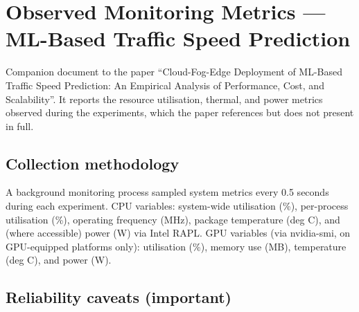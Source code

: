 \documentclass[
  9pt, a4paper, landscape]{article}
\author{}
\date{}
\begin{document}
\hypertarget{observed-monitoring-metrics-ml-based-traffic-speed-prediction}{%
\section{Observed Monitoring Metrics --- ML-Based Traffic Speed
Prediction}\label{observed-monitoring-metrics-ml-based-traffic-speed-prediction}}

Companion document to the paper ``Cloud-Fog-Edge Deployment of ML-Based Traffic Speed Prediction: An Empirical Analysis of Performance, Cost, and Scalability''. It reports the resource utilisation, thermal, and power metrics observed during the experiments, which the paper references but does not present in full.

\hypertarget{collection-methodology}{%
\subsection{Collection methodology}\label{collection-methodology}}

A background monitoring process sampled system metrics every 0.5 seconds during each experiment. CPU variables: system-wide utilisation (\%), per-process utilisation (\%), operating frequency (MHz), package temperature (deg C), and (where accessible) power (W) via Intel RAPL. GPU variables (via nvidia-smi, on GPU-equipped platforms only): utilisation (\%), memory use (MB), temperature (deg C), and power (W).

\hypertarget{reliability-caveats-important}{%
\subsection{Reliability caveats
(important)}\label{reliability-caveats-important}}
\end{document}

